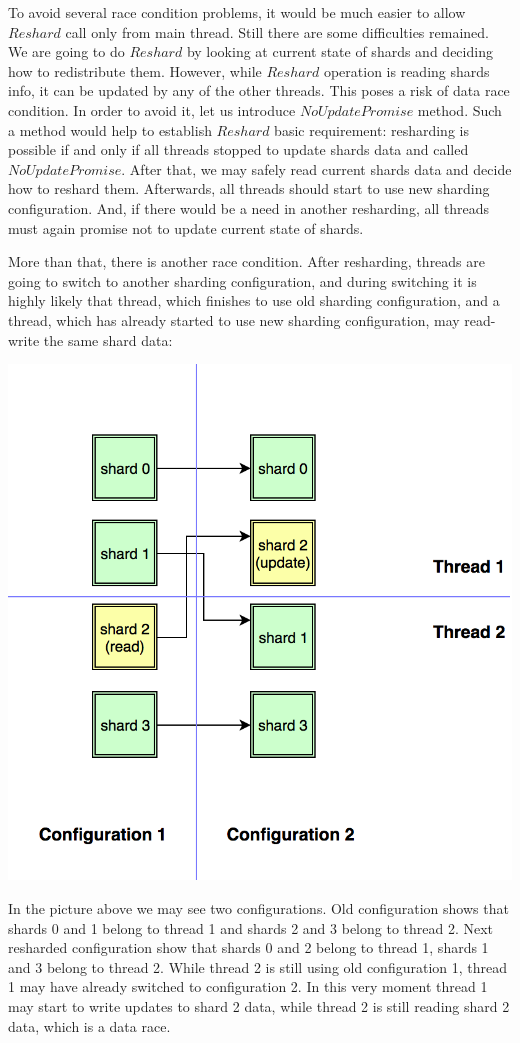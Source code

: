 \documentclass{article}
\begin{document}
To avoid several race condition problems, it would be much easier to allow $Reshard$ call only from main thread. Still there are some difficulties remained. We are going to do $Reshard$ by looking at current state of shards and deciding how to redistribute them. However, while $Reshard$ operation is reading shards info, it can be updated by any of the other threads. This poses a risk of data race condition. In order to avoid it, let us introduce $NoUpdatePromise$ method. Such a method would help to establish $Reshard$ basic requirement: resharding is possible if and only if all threads stopped to update shards data and called $NoUpdatePromise$. After that, we may safely read current shards data and decide how to reshard them. Afterwards, all threads should start to use new sharding configuration. And, if there would be a need in another resharding, all threads must again promise not to update current state of shards.

More than that, there is another race condition. After resharding, threads are going to switch to another sharding configuration, and during switching it is highly likely that thread, which finishes to use old sharding configuration, and a thread, which has already started to use new sharding configuration, may read-write the same shard data:

\begin{center}\includegraphics[width=0.5 \textwidth]{image6.png}\end{center}

In the picture above we may see two configurations. Old configuration shows that shards 0 and 1 belong to thread 1 and shards 2 and 3 belong to thread 2. Next resharded configuration show that shards 0 and 2 belong to thread 1, shards 1 and 3 belong to thread 2. While thread 2 is still using old configuration 1, thread 1 may have already switched to configuration 2. In this very moment thread 1 may start to write updates to shard 2 data, while thread 2 is still reading shard 2 data, which is a data race.
\end{document}

